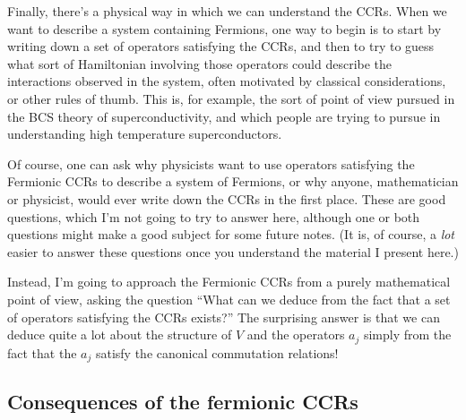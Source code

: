 \documentclass[12pt]{article}
\begin{document}
Finally, there's a physical way in which we can understand the CCRs.
When we want to describe a system containing Fermions, one way to
begin is to start by writing down a set of operators satisfying the
CCRs, and then to try to guess what sort of Hamiltonian involving
those operators could describe the interactions observed in the
system, often motivated by classical considerations, or other rules of
thumb. This is, for example, the sort of point of view pursued in the
BCS theory of superconductivity, and which people are trying to pursue
in understanding high temperature superconductors.

Of course, one can ask why physicists want to use operators satisfying
the Fermionic CCRs to describe a system of Fermions, or why anyone,
mathematician or physicist, would ever write down the CCRs in the
first place.  These are good questions, which I'm not going to try to
answer here, although one or both questions might make a good subject
for some future notes.  (It is, of course, a \emph{lot} easier to
answer these questions once you understand the material I present
here.)

Instead, I'm going to approach the Fermionic CCRs from a purely
mathematical point of view, asking the question ``What can we deduce
from the fact that a set of operators satisfying the CCRs exists?''
The surprising answer is that we can deduce quite a lot about the
structure of $V$ and the operators $a_j$ simply from the fact that the
$a_j$ satisfy the canonical commutation relations!




\subsection{Consequences of the fermionic CCRs}
\end{document}

